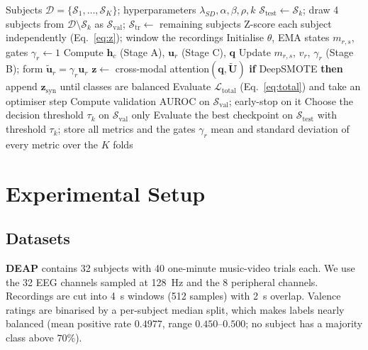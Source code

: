 \documentclass[a4paper,fleqn]{cas-sc}
\begin{document}
\begin{algorithm}[t]
\caption{HCAN-CIB training and LOSO model selection}
\label{alg:loso}
\begin{algorithmic}[1]
\Require Subjects $\mathcal{D}=\{\mathcal{S}_1,\dots,\mathcal{S}_K\}$; hyperparameters $\lambda_{SD},\alpha,\beta,\rho,k$
  \State $\mathcal{S}_{\mathrm{test}}\gets\mathcal{S}_k$;\; draw 4 subjects from $\mathcal{D}\setminus\mathcal{S}_k$ as $\mathcal{S}_{\mathrm{val}}$;\; $\mathcal{S}_{\mathrm{tr}}\gets$ remaining subjects
  \State Z-score each subject independently (Eq.~\ref{eq:z}); window the recordings
  \State Initialise $\theta$, EMA states $m_{r,s}$, gates $\gamma_r\gets1$
      \State Compute $\mathbf{h}_c$ (Stage A), $\mathbf{u}_r$ (Stage C), $\mathbf{q}$
      \State Update $m_{r,s}$, $v_r$, $\gamma_r$ (Stage B); form $\tilde{\mathbf{u}}_r=\gamma_r\mathbf{u}_r$
      \State $\mathbf{z}\gets$ cross-modal attention$(\mathbf{q},\tilde{\mathbf{U}})$
      \State \textbf{if} DeepSMOTE \textbf{then} append $\mathbf{z}_{\mathrm{syn}}$ until classes are balanced
      \State Evaluate $\mathcal{L}_{\mathrm{total}}$ (Eq.~\ref{eq:total}) and take an optimiser step
    \EndFor
    \State Compute validation AUROC on $\mathcal{S}_{\mathrm{val}}$; early-stop on it
  \EndFor
  \State Choose the decision threshold $\tau_k$ on $\mathcal{S}_{\mathrm{val}}$ only
  \State Evaluate the best checkpoint on $\mathcal{S}_{\mathrm{test}}$ with threshold $\tau_k$; store all metrics and the gates $\gamma_r$
\EndFor
\State \Return mean and standard deviation of every metric over the $K$ folds
\end{algorithmic}
\end{algorithm}

\section{Experimental Setup}
\label{sec:setup}

\subsection{Datasets}
\textbf{DEAP} \citep{koelstra2012deap} contains 32 subjects with 40 one-minute music-video trials each. We use the 32 EEG channels sampled at 128~Hz and the 8 peripheral channels. Recordings are cut into 4~s windows (512 samples) with 2~s overlap. Valence ratings are binarised by a per-subject median split, which makes labels nearly balanced (mean positive rate $0.4977$, range $0.450$--$0.500$; no subject has a majority class above $70\%$).
\end{document}
